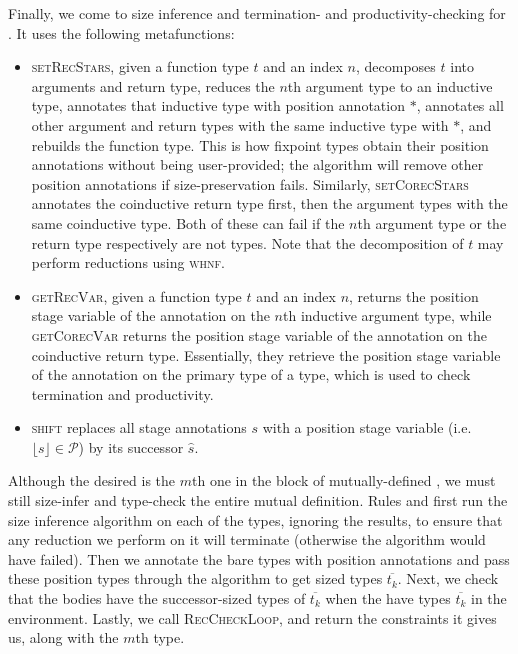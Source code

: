 \documentclass[nonacm,screen,10pt]{acmart}
\begin{document}
Finally, we come to size inference and termination- and productivity-checking for \cofixpoints. It uses the following metafunctions:
\begin{itemize}
    \item \textsc{setRecStars}, given a function type $t$ and an index $n$, decomposes $t$ into arguments and return type, reduces the $n$th argument type to an inductive type, annotates that inductive type with position annotation $*$, annotates all other argument and return types with the same inductive type with $*$, and rebuilds the function type. This is how fixpoint types obtain their position annotations without being user-provided; the algorithm will remove other position annotations if size-preservation fails. Similarly, \textsc{setCorecStars} annotates the coinductive return type first, then the argument types with the same coinductive type. Both of these can fail if the $n$th argument type or the return type respectively are not \coinductive types. Note that the decomposition of $t$ may perform reductions using \textsc{whnf}.
    \item \textsc{getRecVar}, given a function type $t$ and an index $n$, returns the position stage variable of the annotation on the $n$th inductive argument type, while \textsc{getCorecVar} returns the position stage variable of the annotation on the coinductive return type. Essentially, they retrieve the position stage variable of the annotation on the primary \corecursive type of a \cofixpoint type, which is used to check termination and productivity.
    \item \textsc{shift} replaces all stage annotations $s$ with a position stage variable (i.e. $\lfloor s \rfloor \in \mathcal{P}$) by its successor $\hat{s}$.
\end{itemize}

Although the desired \cofixpoint is the $m$th one in the block of mutually-defined \cofixpoints, we must still size-infer and type-check the entire mutual definition. Rules  and  first run the size inference algorithm on each of the \cofixpoint types, ignoring the results, to ensure that any reduction we perform on it will terminate (otherwise the algorithm would have failed). Then we annotate the bare types with position annotations and pass these position types through the algorithm to get sized types $\overline{t_k}$. Next, we check that the \cofixpoint bodies have the successor-sized types of $\overline{t_k}$ when the \cofixpoints have types $\overline{t_k}$ in the environment. Lastly, we call \textsc{RecCheckLoop}, and return the constraints it gives us, along with the $m$th \cofixpoint type.
\end{document}
